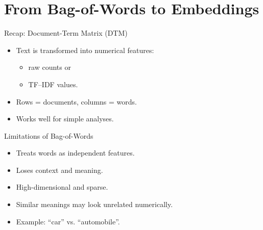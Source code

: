 \documentclass[compress]{beamer}
\begin{document}


\section{From Bag-of-Words to Embeddings}

\begin{frame}{Recap: Document-Term Matrix (DTM)}
    \begin{itemize}
        \item Text is transformed into numerical features:
        \begin{itemize}
            \item raw counts or
            \item TF--IDF values.
        \end{itemize}
        \item Rows = documents, columns = words.
        \item Works well for simple analyses.
    \end{itemize}
\end{frame}


\begin{frame}{Limitations of Bag-of-Words}
    \begin{itemize}
        \item Treats words as independent features.
        \item Loses context and meaning.
        \item High-dimensional and sparse.
        \item Similar meanings may look unrelated numerically.
        \item Example: ``car'' vs. ``automobile''.
    \end{itemize}
\end{frame}

\end{document}
